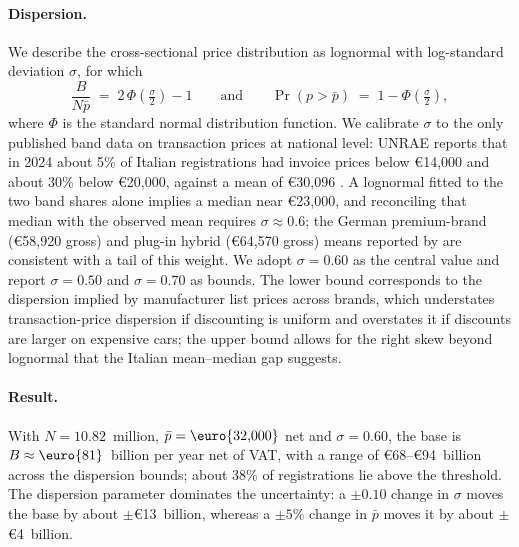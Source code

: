 \paragraph{Dispersion.}
We describe the cross-sectional price distribution as lognormal with log-standard deviation $\sigma$, for which
\begin{equation}
  \frac{B}{N \bar p} \;=\; 2\,\Phi\!\left(\tfrac{\sigma}{2}\right) - 1
  \qquad\text{and}\qquad
  \Pr\left(p > \bar p\right) \;=\; 1 - \Phi\!\left(\tfrac{\sigma}{2}\right),
  \label{eq:auto_lognormal}
\end{equation}
where $\Phi$ is the standard normal distribution function. We calibrate $\sigma$ to the only published band data on transaction prices at national level: UNRAE reports that in 2024 about 5\% of Italian registrations had invoice prices below \euro{14{,}000} and about 30\% below \euro{20{,}000}, against a mean of \euro{30{,}096} \citep{UNRAE2025}. A lognormal fitted to the two band shares alone implies a median near \euro{23{,}000}, and reconciling that median with the observed mean requires $\sigma \approx 0.6$; the German premium-brand (\euro{58{,}920} gross) and plug-in hybrid (\euro{64{,}570} gross) means reported by \citet{DAT2026} are consistent with a tail of this weight. We adopt $\sigma = 0.60$ as the central value and report $\sigma = 0.50$ and $\sigma = 0.70$ as bounds. The lower bound corresponds to the dispersion implied by manufacturer list prices across brands, which understates transaction-price dispersion if discounting is uniform and overstates it if discounts are larger on expensive cars; the upper bound allows for the right skew beyond lognormal that the Italian mean--median gap suggests.

\paragraph{Result.}
With $N = 10.82$~million, $\bar p = \text{\euro{32{,}000}}$ net and $\sigma = 0.60$, the base is $B \approx \text{\euro{81}}$~billion per year net of VAT, with a range of \euro{68}--\euro{94}~billion across the dispersion bounds; about 38\% of registrations lie above the threshold. The dispersion parameter dominates the uncertainty: a $\pm 0.10$ change in $\sigma$ moves the base by about $\pm$\euro{13}~billion, whereas a $\pm 5\%$ change in $\bar p$ moves it by about $\pm$\euro{4}~billion.

